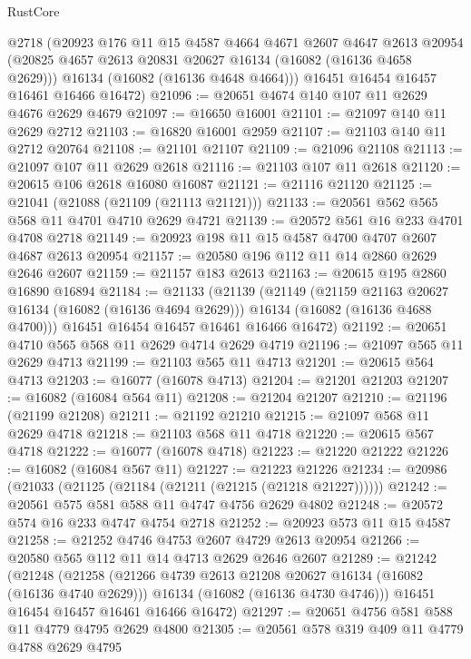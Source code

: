 \begin{lexlean}{RustCore}
\begin{coremodule}
      @2718
      (@20923
        @176
        @11
        @15
        @4587
        @4664
        @4671
        @2607
        @4647
        @2613
        @20954
        (@20825 @4657 @2613 @20831 @20627 @16134 (@16082 (@16136 @4658 @2629)))
        @16134
        (@16082 (@16136 @4648 @4664)))
      @16451
      @16454
      @16457
      @16461
      @16466
      @16472)
@21096 := @20651 @4674 @140 @107 @11 @2629 @4676 @2629 @4679
@21097 := @16650 @16001
@21101 := @21097 @140 @11 @2629 @2712
@21103 := @16820 @16001 @2959
@21107 := @21103 @140 @11 @2712 @20764
@21108 := @21101 @21107
@21109 := @21096 @21108
@21113 := @21097 @107 @11 @2629 @2618
@21116 := @21103 @107 @11 @2618
@21120 := @20615 @106 @2618 @16080 @16087
@21121 := @21116 @21120
@21125 := @21041 (@21088 (@21109 (@21113 @21121)))
@21133 := @20561 @562 @565 @568 @11 @4701 @4710 @2629 @4721
@21139 := @20572 @561 @16 @233 @4701 @4708 @2718
@21149 := @20923 @198 @11 @15 @4587 @4700 @4707 @2607 @4687 @2613 @20954
@21157 := @20580 @196 @112 @11 @14 @2860 @2629 @2646 @2607
@21159 := @21157 @183 @2613
@21163 := @20615 @195 @2860 @16890 @16894
@21184 := @21133
    (@21139
      (@21149
        (@21159 @21163 @20627 @16134 (@16082 (@16136 @4694 @2629)))
        @16134
        (@16082 (@16136 @4688 @4700)))
      @16451
      @16454
      @16457
      @16461
      @16466
      @16472)
@21192 := @20651 @4710 @565 @568 @11 @2629 @4714 @2629 @4719
@21196 := @21097 @565 @11 @2629 @4713
@21199 := @21103 @565 @11 @4713
@21201 := @20615 @564 @4713
@21203 := @16077 (@16078 @4713)
@21204 := @21201 @21203
@21207 := @16082 (@16084 @564 @11)
@21208 := @21204 @21207
@21210 := @21196 (@21199 @21208)
@21211 := @21192 @21210
@21215 := @21097 @568 @11 @2629 @4718
@21218 := @21103 @568 @11 @4718
@21220 := @20615 @567 @4718
@21222 := @16077 (@16078 @4718)
@21223 := @21220 @21222
@21226 := @16082 (@16084 @567 @11)
@21227 := @21223 @21226
@21234 := @20986 (@21033 (@21125 (@21184 (@21211 (@21215 (@21218 @21227))))))
@21242 := @20561 @575 @581 @588 @11 @4747 @4756 @2629 @4802
@21248 := @20572 @574 @16 @233 @4747 @4754 @2718
@21252 := @20923 @573 @11 @15 @4587
@21258 := @21252 @4746 @4753 @2607 @4729 @2613 @20954
@21266 := @20580 @565 @112 @11 @14 @4713 @2629 @2646 @2607
@21289 := @21242
    (@21248
      (@21258
        (@21266 @4739 @2613 @21208 @20627 @16134 (@16082 (@16136 @4740 @2629)))
        @16134
        (@16082 (@16136 @4730 @4746)))
      @16451
      @16454
      @16457
      @16461
      @16466
      @16472)
@21297 := @20651 @4756 @581 @588 @11 @4779 @4795 @2629 @4800
@21305 := @20561 @578 @319 @409 @11 @4779 @4788 @2629 @4795

\end{coremodule}
\end{lexlean}

